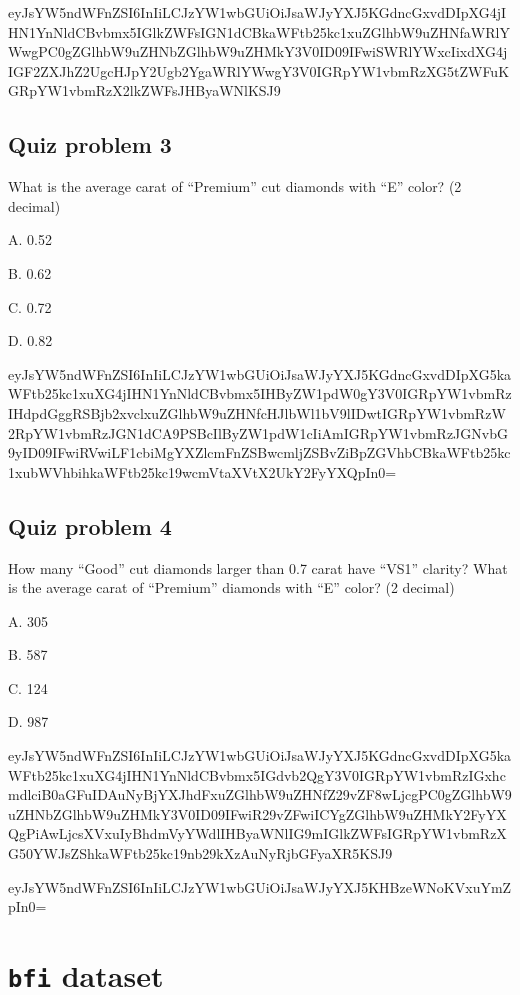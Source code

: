 \documentclass[]{book}
\begin{document}
eyJsYW5ndWFnZSI6InIiLCJzYW1wbGUiOiJsaWJyYXJ5KGdncGxvdDIpXG4jIHN1YnNldCBvbmx5IGlkZWFsIGN1dCBkaWFtb25kc1xuZGlhbW9uZHNfaWRlYWwgPC0gZGlhbW9uZHNbZGlhbW9uZHMkY3V0ID09IFwiSWRlYWxcIixdXG4jIGF2ZXJhZ2UgcHJpY2Ugb2YgaWRlYWwgY3V0IGRpYW1vbmRzXG5tZWFuKGRpYW1vbmRzX2lkZWFsJHByaWNlKSJ9

\hypertarget{quiz-problem-3-1}{%
\subsection{Quiz problem 3}\label{quiz-problem-3-1}}

What is the average carat of ``Premium'' cut diamonds with ``E'' color? (2 decimal)

A. 0.52

B. 0.62

C. 0.72

D. 0.82

eyJsYW5ndWFnZSI6InIiLCJzYW1wbGUiOiJsaWJyYXJ5KGdncGxvdDIpXG5kaWFtb25kc1xuXG4jIHN1YnNldCBvbmx5IHByZW1pdW0gY3V0IGRpYW1vbmRzIHdpdGggRSBjb2xvclxuZGlhbW9uZHNfcHJlbWl1bV9lIDwtIGRpYW1vbmRzW2RpYW1vbmRzJGN1dCA9PSBcIlByZW1pdW1cIiAmIGRpYW1vbmRzJGNvbG9yID09IFwiRVwiLF1cbiMgYXZlcmFnZSBwcmljZSBvZiBpZGVhbCBkaWFtb25kc1xubWVhbihkaWFtb25kc19wcmVtaXVtX2UkY2FyYXQpIn0=

\hypertarget{quiz-problem-4-1}{%
\subsection{Quiz problem 4}\label{quiz-problem-4-1}}

How many ``Good'' cut diamonds larger than 0.7 carat have ``VS1'' clarity?
What is the average carat of ``Premium'' diamonds with ``E'' color? (2 decimal)

A. 305

B. 587

C. 124

D. 987

eyJsYW5ndWFnZSI6InIiLCJzYW1wbGUiOiJsaWJyYXJ5KGdncGxvdDIpXG5kaWFtb25kc1xuXG4jIHN1YnNldCBvbmx5IGdvb2QgY3V0IGRpYW1vbmRzIGxhcmdlciB0aGFuIDAuNyBjYXJhdFxuZGlhbW9uZHNfZ29vZF8wLjcgPC0gZGlhbW9uZHNbZGlhbW9uZHMkY3V0ID09IFwiR29vZFwiICYgZGlhbW9uZHMkY2FyYXQgPiAwLjcsXVxuIyBhdmVyYWdlIHByaWNlIG9mIGlkZWFsIGRpYW1vbmRzXG50YWJsZShkaWFtb25kc19nb29kXzAuNyRjbGFyaXR5KSJ9

eyJsYW5ndWFnZSI6InIiLCJzYW1wbGUiOiJsaWJyYXJ5KHBzeWNoKVxuYmZpIn0=

\hypertarget{bfi-dataset}{%
\section{\texorpdfstring{\texttt{bfi} dataset}{bfi dataset}}\label{bfi-dataset}}
\end{document}
